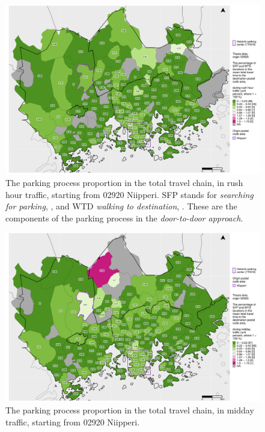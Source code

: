 \begin{figure}
    \centering
    \includegraphics[trim={0.9cm 0.3cm 0.25cm 0.3cm},clip,width=\textwidth]{images/compare_traveltimes_mapfill-msc_r_pct_fromzip-02920_28-09-2020.png}
    \caption[Parking process proportion from Niipperi, rush hour traffic]{The parking process proportion in the total travel chain, in rush hour traffic, starting from 02920 Niipperi. SFP stands for \textit{searching for parking}, , and WTD \textit{walking to destination}, . These are the components of the parking process in the \textit{door-to-door approach}.}%
    \label{fig:compare_msc_r_pct_02920}%
\end{figure}

\begin{figure}
    \centering
    \includegraphics[trim={0.9cm 0.3cm 0.25cm 0.3cm},clip,width=\textwidth]{images/compare_traveltimes_mapfill-msc_m_pct_fromzip-02920_28-09-2020.png}
    \caption[Parking process proportion from Niipperi, midday traffic]{The parking process proportion in the total travel chain, in midday traffic, starting from 02920 Niipperi.}%
    \label{fig:compare_msc_m_pct_02920}%
\end{figure}

